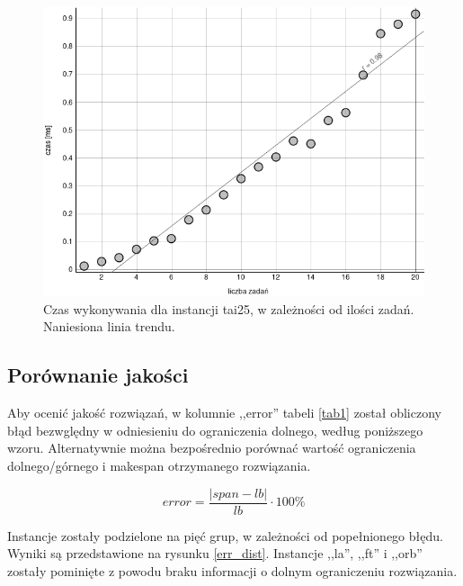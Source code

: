\documentclass[11pt,twocolumn]{article}
\begin{document}
\begin{figure}[h!]
	\includegraphics[width=\linewidth]{tai_czas.png}
	\caption{Czas wykonywania dla instancji tai25,
        w zależności od ilości zadań.
        Naniesiona linia trendu.
        \label{tai_czas}}
\end{figure}

\subsection{Porównanie jakości}

Aby ocenić jakość rozwiązań, w kolumnie ,,error'' tabeli \ref{tab1}
został obliczony błąd bezwględny w odniesieniu do ograniczenia dolnego,
według poniższego wzoru.
Alternatywnie można bezpośrednio porównać wartość ograniczenia dolnego/górnego
i makespan otrzymanego rozwiązania.

$$ error = \frac{|span - lb|}{lb} \cdot 100\% $$

Instancje zostały podzielone na pięć grup, w zależności od popełnionego błędu.
Wyniki są przedstawione na rysunku \ref{err_dist}.
Instancje ,,la'', ,,ft'' i ,,orb'' zostały pominięte z powodu braku informacji
o dolnym ograniczeniu rozwiązania.
\end{document}
